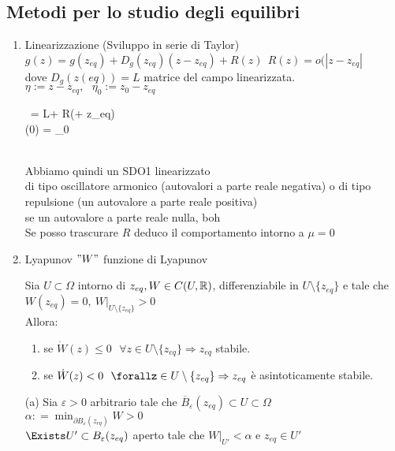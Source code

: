 \documentclass{article}
\begin{document}
	\subsection{Metodi per lo studio degli equilibri}
	\begin{enumerate}
		\item Linearizzazione (Sviluppo in serie di Taylor)\\
		$g(z) = g(z_{eq}) + D_g(z_{eq})(z-z_{eq}) + R(z) \ \ R(z) = o(|z-z_{eq}|$\\
		dove $D_g(z(eq)) = L$ matrice del campo linearizzata.\\
		$\eta := z - z_{eq},\ \ \ \eta_0 := z_0 - z_{eq}$\\
		\begin{cases}
			\ \dot\eta = L\eta + R(\eta + z_{eq})\ \\ \eta(0) = \eta_0
		\end{cases}\\
		Abbiamo quindi un SDO1 linearizzato\\
		di tipo oscillatore armonico (autovalori a parte reale negativa) o di tipo repulsione (un autovalore a parte reale positiva)\\
		se un autovalore a parte reale nulla, boh\\[10px]
 Se posso trascurare $R$ deduco il comportamento intorno a $\mu = 0$
\item Lyapunov $"W"$ funzione di Lyapunov\\
	\newpage
	\begin{teo}
		Sia $U\subset \Omega$ intorno di  $z_{eq}, W\in C(U,\mathbb{R})$, differenziabile in  $U\setminus\{z_{eq}\}$ e tale che  $W(z_{eq}) = 0, \ W|_{U\setminus\{z_{eq}\}}>0$\\
		Allora: 
		 \begin{enumerate}
			 \item se $\dot W(z) \leq 0\ \ \ \forall z\in U\setminus\{z_{eq}\} \Rightarrow  z_{eq}$ stabile.
			 \item se $\dot W(z) < 0 \ \ \forallz\in U\setminus\{z_{eq}\} \Rightarrow  z_{eq} $ è asintoticamente stabile.
		\end{enumerate}
	\end{teo}
	\begin{dimo}
		(a) Sia $\varepsilon > 0$ arbitrario tale che $\overline B_\varepsilon (z_{eq})\subset U\subset \Omega$\\
		$\displaystyle\alpha : = \min_{\partial B_\varepsilon(z_{eq})} W > 0$\\
		$\Exists U'\subset B_\varepsilon (z_{eq})$ aperto tale che $W|_{U'} < \alpha$ e  $z_{eq}\in U'$ \\

\end{dimo}
\end{enumerate}
\end{document}
